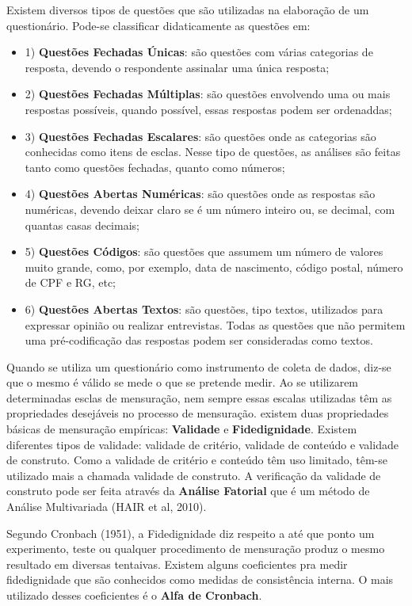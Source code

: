 Existem diversos tipos de questões que são utilizadas na elaboração de um questionário. Pode-se classificar didaticamente as questões em:


\begin{itemize}
\item{1)} \textbf{Questões Fechadas Únicas}: são questões com várias categorias de resposta, devendo o respondente assinalar uma única resposta;
\item{2)} \textbf{Questões Fechadas Múltiplas}: são questões envolvendo uma ou mais respostas possíveis, quando possível, essas respostas podem ser ordenaddas;
\item{3)} \textbf{ Questões Fechadas Escalares}: são questões onde  as categorias são conhecidas como itens de esclas. Nesse tipo de questões, as análises são feitas tanto como questões fechadas, quanto como números;
\item{4)} \textbf{ Questões Abertas Numéricas}: são questões onde as respostas são numéricas, devendo deixar claro se é um número inteiro ou, se decimal, com quantas casas decimais;
\item{5)} \textbf{ Questões Códigos}: são questões que assumem  um número de valores muito grande, como, por exemplo, data de nascimento, código postal, número de CPF e RG, etc;
\item{6)} \textbf{ Questões Abertas Textos}: são questões, tipo textos, utilizados para expressar opinião ou realizar entrevistas. Todas as questões que não permitem uma pré-codificação das respostas podem ser consideradas como textos.
\end{itemize}


Quando se utiliza um questionário como instrumento de coleta de dados, diz-se que o mesmo é válido se mede o que se pretende medir. Ao se utilizarem determinadas esclas de mensuração, nem sempre essas escalas utilizadas têm as propriedades desejáveis no processo de mensuração. existem duas propriedades básicas de mensuração empíricas: \textbf{Validade} e \textbf{Fidedignidade}. Existem diferentes tipos de validade: validade de critério, validade de conteúdo e validade de construto. Como a validade de critério e conteúdo têm uso limitado, têm-se utilizado mais a chamada validade de construto. A verificação da validade de construto pode ser feita através da \textbf{Análise Fatorial} que é um método de Análise Multivariada (HAIR et al, 2010).\vskip0.3cm

Segundo Cronbach (1951), a Fidedignidade diz respeito a até que ponto um experimento, teste ou qualquer procedimento de mensuração produz o mesmo resultado em diversas tentaivas. Existem alguns coeficientes pra medir fidedignidade que são conhecidos como medidas de consistência interna. O mais utilizado desses coeficientes é o \textbf{Alfa de Cronbach}.  \vskip0.3cm

